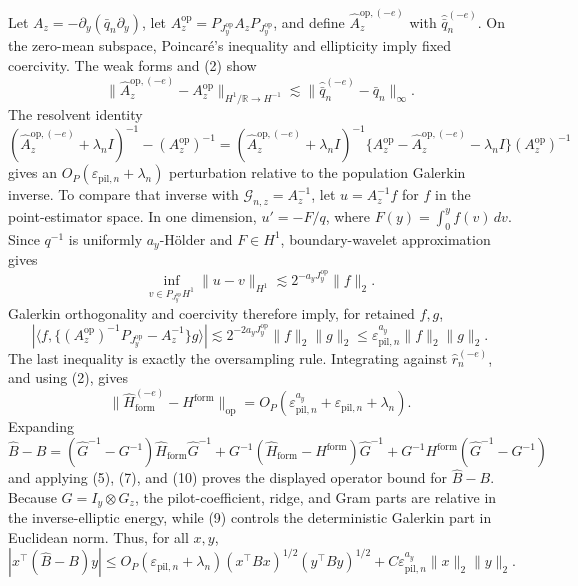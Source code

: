 Let \(A_z=-\partial_y(\bar q_n\partial_y)\), let \(A_z^{\mathrm{op}}=P_{J_y^{\mathrm{op}}}A_zP_{J_y^{\mathrm{op}}}\), and define \(\widehat A_z^{\mathrm{op},(-e)}\) with \(\widehat{\bar q}_n^{(-e)}\).  On the zero-mean subspace, Poincar\'e's inequality and ellipticity imply fixed coercivity.  The weak forms and (2) show
\[
\|\widehat A_z^{\mathrm{op},(-e)}-A_z^{\mathrm{op}}\|_{H^1/\mathbb R\to H^{-1}}
\lesssim\|\widehat{\bar q}_n^{(-e)}-\bar q_n\|_\infty.
\]
The resolvent identity
\[
(\widehat A_z^{\mathrm{op},(-e)}+\lambda_nI)^{-1}-(A_z^{\mathrm{op}})^{-1}
=(\widehat A_z^{\mathrm{op},(-e)}+\lambda_nI)^{-1}
\{A_z^{\mathrm{op}}-\widehat A_z^{\mathrm{op},(-e)}-\lambda_nI\}(A_z^{\mathrm{op}})^{-1} \tag{8}
\]
gives an \(O_P(\varepsilon_{\mathrm{pil},n}+\lambda_n)\) perturbation relative to the population Galerkin inverse.  To compare that inverse with \(\mathcal G_{n,z}=A_z^{-1}\), let \(u=A_z^{-1}f\) for \(f\) in the point-estimator space.  In one dimension, \(u'=-F/q\), where \(F(y)=\int_0^yf(v)\,dv\).  Since \(q^{-1}\) is uniformly \(a_y\)-H\"older and \(F\in H^1\), boundary-wavelet approximation gives
\[
\inf_{v\in P_{J_y^{\mathrm{op}}}H^1}\|u-v\|_{H^1}
\lesssim2^{-a_yJ_y^{\mathrm{op}}}\|f\|_2.
\]
Galerkin orthogonality and coercivity therefore imply, for retained \(f,g\),
\[
|\langle f,\{(A_z^{\mathrm{op}})^{-1}P_{J_y^{\mathrm{op}}}-A_z^{-1}\}g\rangle|
\lesssim2^{-2a_yJ_y^{\mathrm{op}}}\|f\|_2\|g\|_2
\le\varepsilon_{\mathrm{pil},n}^{a_y}\|f\|_2\|g\|_2.                  \tag{9}
\]
The last inequality is exactly the oversampling rule.  Integrating against \(\widehat r_n^{(-e)}\), and using (2), gives
\[
\|\widehat H_{\mathrm{form}}^{(-e)}-H^{\mathrm{form}}\|_{\mathrm{op}}
=O_P(\varepsilon_{\mathrm{pil},n}^{a_y}+\varepsilon_{\mathrm{pil},n}+\lambda_n). \tag{10}
\]
Expanding
\[
\widehat B-B
=(\widehat G^{-1}-G^{-1})\widehat H_{\mathrm{form}}\widehat G^{-1}
+G^{-1}(\widehat H_{\mathrm{form}}-H^{\mathrm{form}})\widehat G^{-1}
+G^{-1}H^{\mathrm{form}}(\widehat G^{-1}-G^{-1})                         \tag{11}
\]
and applying (5), (7), and (10) proves the displayed operator bound for \(\widehat B-B\).  Because \(G=I_y\otimes G_z\), the pilot-coefficient, ridge, and Gram parts are relative in the inverse-elliptic energy, while (9) controls the deterministic Galerkin part in Euclidean norm.  Thus, for all \(x,y\),
\[
|x^{\top}(\widehat B-B)y|
\le O_P(\varepsilon_{\mathrm{pil},n}+\lambda_n)
(x^{\top}Bx)^{1/2}(y^{\top}By)^{1/2}
+C\varepsilon_{\mathrm{pil},n}^{a_y}\|x\|_2\|y\|_2.                  \tag{12}
\]

